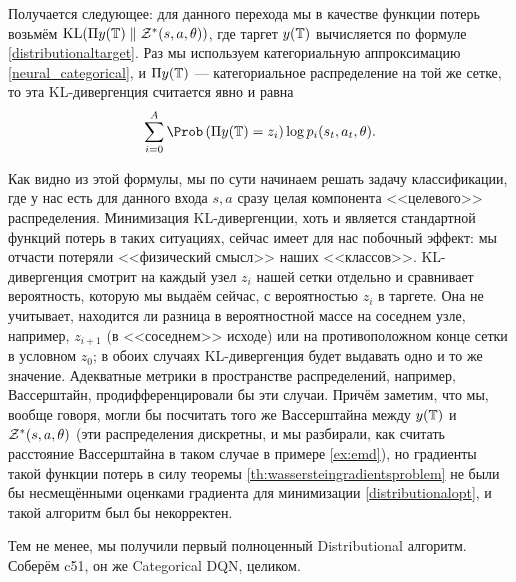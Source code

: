 Получается следующее: для данного перехода мы в качестве функции потерь возьмём $\KL (\Pi y(\T) \HM\parallel \Z^*(s, a, \theta))$, где таргет $y(\mathbb{T})$ вычисляется по формуле \eqref{distributionaltarget}. Раз мы используем категориальную аппроксимацию \eqref{neural_categorical}, и $\Pi y(\mathbb{T})$ --- категориальное распределение на той же сетке, то эта KL-дивергенция считается явно и равна
$$\sum_{i=0}^{A} \Prob \left( \Pi y(\T) = z_i \right) \log p_i(s_t, a_t, \theta).$$

Как видно из этой формулы, мы по сути начинаем решать задачу классификации, где у нас есть для данного входа $s, a$ сразу целая компонента <<целевого>> распределения. Минимизация KL-дивергенции, хоть и является стандартной функций потерь в таких ситуациях, сейчас имеет для нас побочный эффект: мы отчасти потеряли <<физический смысл>> наших <<классов>>. KL-дивергенция смотрит на каждый узел $z_i$ нашей сетки отдельно и сравнивает вероятность, которую мы выдаём сейчас, с вероятностью $z_i$ в таргете. Она не учитывает, находится ли разница в вероятностной массе на соседнем узле, например, $z_{i+1}$ (в <<соседнем>> исходе) или на противоположном конце сетки в условном $z_0$; в обоих случаях KL-дивергенция будет выдавать одно и то же значение. Адекватные метрики в пространстве распределений, например, Вассерштайн, продифференцировали бы эти случаи. Причём заметим, что мы, вообще говоря, могли бы посчитать того же Вассерштайна между $y(\mathbb{T})$ и $\mathcal{Z}^*(s, a, \theta)$ (эти распределения дискретны, и мы разбирали, как считать расстояние Вассерштайна в таком случае в примере \ref{ex:emd}), но градиенты такой функции потерь в силу теоремы \ref{th:wassersteingradientsproblem} не были бы несмещёнными оценками градиента для минимизации \eqref{distributionalopt}, и такой алгоритм был бы некорректен.

Тем не менее, мы получили первый полноценный Distributional алгоритм. Соберём c51, он же Categorical DQN, целиком.

